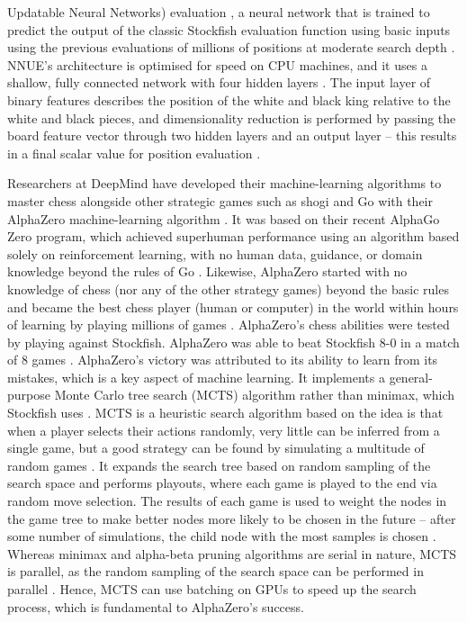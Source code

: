 \documentclass[%
 superscriptaddress,
showpacs,preprintnumbers,
 amsmath,
 amssymb,
 aps,
 pra,
showkeys,
onecolumn,
notitlepage,
11pt,
tightenlines      %
]{revtex4-1}
\begin{document}
Updatable Neural Networks) evaluation \cite{nasu2018efficiently}, a neural network that is trained to predict the output of the classic Stockfish evaluation function using basic inputs using the previous evaluations of millions of positions at moderate search depth \cite{stockfishNNUEEvaluation}. NNUE's architecture is optimised for speed on CPU machines, and it uses a shallow, fully connected network with four hidden layers \cite{guideToStockfishNNUE}. The input layer of binary features describes the position of the white and black king relative to the white and black pieces, and dimensionality reduction is performed by passing the board feature vector through two hidden layers and an output layer -- this results in a final scalar value for position evaluation \cite{maharaj2022chess}.

Researchers at DeepMind have developed their machine-learning algorithms to master chess alongside other strategic games such as shogi and Go with their AlphaZero machine-learning algorithm \cite{silver2018general}. It was based on their recent AlphaGo Zero program, which achieved superhuman performance using an algorithm based solely on reinforcement learning, with no human data, guidance, or domain knowledge beyond the rules of Go \cite{silver2017mastering}. Likewise, AlphaZero started with no knowledge of chess (nor any of the other strategy games) beyond the basic rules and became the best chess player (human or computer) in the world within hours of learning by playing millions of games \cite{strogatz2018one}. AlphaZero's chess abilities were tested by playing against Stockfish. AlphaZero was able to beat Stockfish 8-0 in a match of 8 games \cite{silver2018general}. AlphaZero's victory was attributed to its ability to learn from its mistakes, which is a key aspect of machine learning. It implements a general-purpose Monte Carlo tree search (MCTS) algorithm rather than minimax, which Stockfish uses \cite{silver2017mastering2}. MCTS is a heuristic search algorithm based on the idea is that when a player selects their actions randomly, very little can be inferred from a single game, but a good strategy can be found by simulating a multitude of random games \cite{chaslot2008monte}. It expands the search tree based on random sampling of the search space and performs playouts, where each game is played to the end via random move selection. The results of each game is used to weight the nodes in the game tree to make better nodes more likely to be chosen in the future -- after some number of simulations, the child node with the most samples is chosen \cite{chaslot2008monte}. Whereas minimax and alpha-beta pruning algorithms are serial in nature, MCTS is parallel, as the random sampling of the search space can be performed in parallel \cite{silver2017mastering2}. Hence, MCTS can use batching on GPUs to speed up the search process, which is fundamental to AlphaZero's success.
\end{document}
